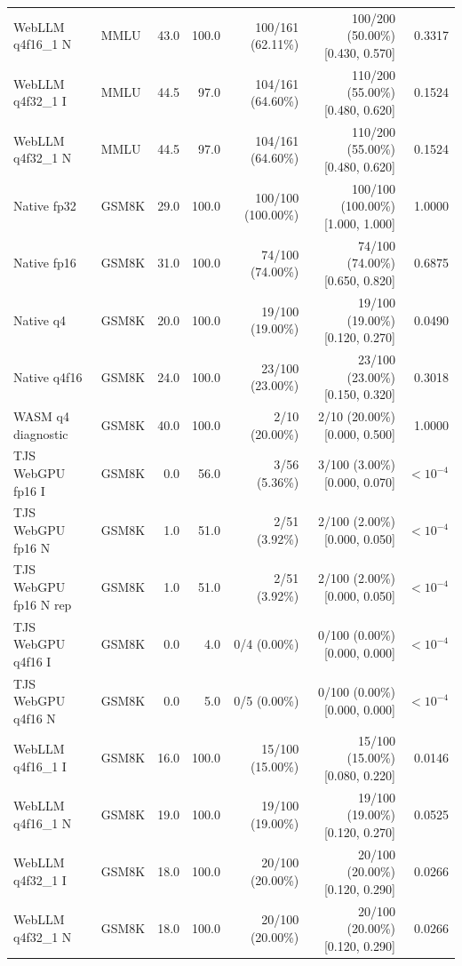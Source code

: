 \documentclass[conference]{IEEEtran}
\begin{document}
\begin{table}[!t]
\begin{tabular}{@{}llrrrrr@{}}
WebLLM q4f16\_1 N & MMLU & 43.0 & 100.0 & 100/161 (62.11\%) & 100/200 (50.00\%) [0.430, 0.570] & 0.3317\\
WebLLM q4f32\_1 I & MMLU & 44.5 & 97.0 & 104/161 (64.60\%) & 110/200 (55.00\%) [0.480, 0.620] & 0.1524\\
WebLLM q4f32\_1 N & MMLU & 44.5 & 97.0 & 104/161 (64.60\%) & 110/200 (55.00\%) [0.480, 0.620] & 0.1524\\
\midrule
Native fp32 & GSM8K & 29.0 & 100.0 & 100/100 (100.00\%) & 100/100 (100.00\%) [1.000, 1.000] & 1.0000\\
Native fp16 & GSM8K & 31.0 & 100.0 & 74/100 (74.00\%) & 74/100 (74.00\%) [0.650, 0.820] & 0.6875\\
Native q4 & GSM8K & 20.0 & 100.0 & 19/100 (19.00\%) & 19/100 (19.00\%) [0.120, 0.270] & 0.0490\\
Native q4f16 & GSM8K & 24.0 & 100.0 & 23/100 (23.00\%) & 23/100 (23.00\%) [0.150, 0.320] & 0.3018\\
WASM q4 diagnostic & GSM8K & 40.0 & 100.0 & 2/10 (20.00\%) & 2/10 (20.00\%) [0.000, 0.500] & 1.0000\\
TJS WebGPU fp16 I & GSM8K & 0.0 & 56.0 & 3/56 (5.36\%) & 3/100 (3.00\%) [0.000, 0.070] & $<10^{-4}$\\
TJS WebGPU fp16 N & GSM8K & 1.0 & 51.0 & 2/51 (3.92\%) & 2/100 (2.00\%) [0.000, 0.050] & $<10^{-4}$\\
TJS WebGPU fp16 N rep & GSM8K & 1.0 & 51.0 & 2/51 (3.92\%) & 2/100 (2.00\%) [0.000, 0.050] & $<10^{-4}$\\
TJS WebGPU q4f16 I & GSM8K & 0.0 & 4.0 & 0/4 (0.00\%) & 0/100 (0.00\%) [0.000, 0.000] & $<10^{-4}$\\
TJS WebGPU q4f16 N & GSM8K & 0.0 & 5.0 & 0/5 (0.00\%) & 0/100 (0.00\%) [0.000, 0.000] & $<10^{-4}$\\
WebLLM q4f16\_1 I & GSM8K & 16.0 & 100.0 & 15/100 (15.00\%) & 15/100 (15.00\%) [0.080, 0.220] & 0.0146\\
WebLLM q4f16\_1 N & GSM8K & 19.0 & 100.0 & 19/100 (19.00\%) & 19/100 (19.00\%) [0.120, 0.270] & 0.0525\\
WebLLM q4f32\_1 I & GSM8K & 18.0 & 100.0 & 20/100 (20.00\%) & 20/100 (20.00\%) [0.120, 0.290] & 0.0266\\
WebLLM q4f32\_1 N & GSM8K & 18.0 & 100.0 & 20/100 (20.00\%) & 20/100 (20.00\%) [0.120, 0.290] & 0.0266\\
\bottomrule
\end{tabular}
\end{table}
\end{document}

